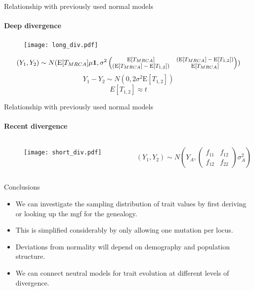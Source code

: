 \documentclass{beamer}
\newcommand{\E}{\mathrm{E}}
\begin{document}
\begin{frame}{Relationship with previously used normal models}
  \framesubtitle{Deep divergence}
  \begin{figure}
    \texttt{[image: long\_div.pdf]}      
  \end{figure}
  \begin{equation*}
    \footnotesize
    (Y_1 , Y_2) \sim N(\E[T_{MRCA}] \mu \mathbf{1}, \sigma^2
    \begin{pmatrix}
      \E[T_{MRCA}] & (\E[T_{MRCA}] - \E[T_{1,2}])  \\
      (\E[T_{MRCA}] - \E[T_{1,2}]) & \E[T_{MRCA}]
    \end{pmatrix})
  \end{equation*}
  \begin{equation*}
    Y_1 - Y_2 \sim N(0, 2 \sigma^2 \E[T_{1,2}])
  \end{equation*}
  \begin{equation*}
    E[T_{1,2}] \approx t
  \end{equation*}
\end{frame}

\begin{frame}{Relationship with previously used normal models}
  \framesubtitle{Recent divergence}
  \begin{columns}
    \begin{column}{0.5\textwidth}
      \begin{figure}
        \texttt{[image: short\_div.pdf]}   
      \end{figure}
    \end{column}
    \begin{column}{0.47\textwidth}
      \begin{equation*}
        (Y_1,Y_2) \sim N(Y_A,
          \begin{pmatrix}
            f_{11} & f_{12}\\
            f_{12} & f_{22}
          \end{pmatrix}\sigma_A^2)
      \end{equation*}
    \end{column}
  \end{columns}
\end{frame}

\begin{frame}{Conclusions}
  \begin{itemize}
  \item We can investigate the sampling distribution of trait values by first
    deriving or looking up the mgf for the genealogy.
  \item This is simplified considerably by only allowing one mutation per locus.
  \item Deviations from normality will depend on demography and population
    structure.
  \item We can connect neutral models for trait evolution at different levels of
    divergence.
  \end{itemize}
\end{frame}
\end{document}

